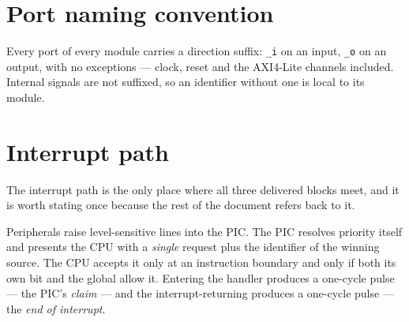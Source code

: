 \section{Port naming convention}
\label{sec:portnaming}

Every port of every module carries a direction suffix: \texttt{\_i} on an input,
\texttt{\_o} on an output, with no exceptions --- clock, reset and the AXI4-Lite
channels included. Internal signals are not suffixed, so an identifier without
one is local to its module.

\section{Interrupt path}

The interrupt path is the only place where all three delivered blocks meet, and
it is worth stating once because the rest of the document refers back to it.

Peripherals raise level-sensitive lines into the PIC. The PIC resolves priority
itself and presents the CPU with a \emph{single} request plus the identifier of
the winning source. The CPU accepts it only at an instruction boundary and only
if both its own  bit and the global  allow it. Entering
the handler produces a one-cycle  pulse --- the PIC's
\emph{claim} --- and the interrupt-returning  produces a one-cycle
 pulse --- the \emph{end of interrupt}.

